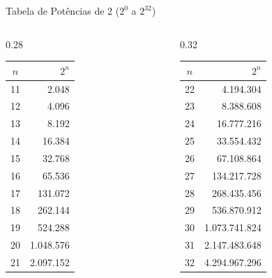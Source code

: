 \begin{frame}{Tabela de Potências de 2 ($2^0$ a $2^{32}$)}
\begin{columns}[t]
        \begin{column}{0.28\textwidth}
            \centering
            \begin{tabular}{|c|r|}
                \hline
                \textbf{$n$} & \textbf{$2^n$} \\ \hline
                11           & 2.048          \\ \hline
                12           & 4.096          \\ \hline
                13           & 8.192          \\ \hline
                14           & 16.384         \\ \hline
                15           & 32.768         \\ \hline
                16           & 65.536         \\ \hline
                17           & 131.072        \\ \hline
                18           & 262.144        \\ \hline
                19           & 524.288        \\ \hline
                20           & 1.048.576      \\ \hline
                21           & 2.097.152      \\ \hline
            \end{tabular}
        \end{column}

        \begin{column}{0.32\textwidth}
            \centering
            \begin{tabular}{|c|r|}
                \hline
                \textbf{$n$} & \textbf{$2^n$} \\ \hline
                22           & 4.194.304      \\ \hline
                23           & 8.388.608      \\ \hline
                24           & 16.777.216     \\ \hline
                25           & 33.554.432     \\ \hline
                26           & 67.108.864     \\ \hline
                27           & 134.217.728    \\ \hline
                28           & 268.435.456    \\ \hline
                29           & 536.870.912    \\ \hline
                30           & 1.073.741.824  \\ \hline
                31           & 2.147.483.648  \\ \hline
                32           & 4.294.967.296  \\ \hline
            \end{tabular}
        \end{column}
    \end{columns}
\end{frame}